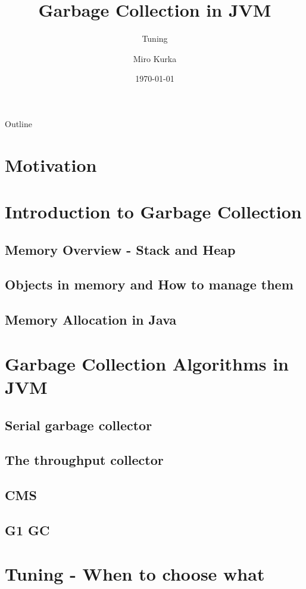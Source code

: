 \documentclass{beamer}
\title{Garbage Collection in JVM}
\subtitle{Tuning}
\author{Miro Kurka}
\institute{Pavol Jozef Safarik University}
\date{\today}
\begin{document}
\begin{frame}
\titlepage
\end{frame}
\begin{frame}{Outline}
    \tableofcontents
\end{frame}
\section{Motivation}

\section{Introduction to Garbage Collection}
\subsection{Memory Overview - Stack and Heap}
\subsection{Objects in memory and How to manage them}
\subsection{Memory Allocation in Java}

\section{Garbage Collection Algorithms in JVM}
    \subsection{Serial garbage collector}
    \subsection{The throughput collector}
    \subsection{CMS}
    \subsection{G1 GC}
    
\section{Tuning - When to choose what}
\end{document}
